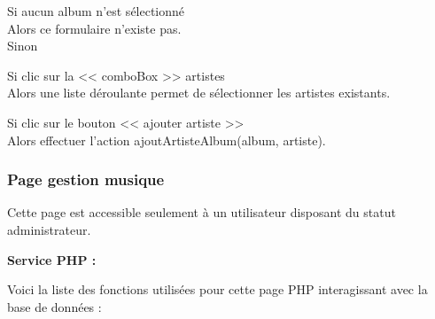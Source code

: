 			\begin{paragraphe}
				Si aucun album n'est sélectionné \\
				Alors ce formulaire n'existe pas. \\
				Sinon
			\end{paragraphe}

			\begin{paragraphe}
				Si clic sur la << comboBox >> artistes \\
				Alors une liste déroulante permet de sélectionner les artistes existants.
			\end{paragraphe}

			\begin{paragraphe}
				Si clic sur le bouton << ajouter artiste >> \\
				Alors effectuer l'action ajoutArtisteAlbum(album, artiste).
			\end{paragraphe}

		\subsubsection{Page gestion musique}

			\begin{paragraphe}
				Cette page est accessible seulement à un utilisateur disposant du statut administrateur.
			\end{paragraphe}

			\begin{paragraphe}
				\textbf{Service PHP :}
			\end{paragraphe}

			\begin{paragraphe}
				Voici la liste des fonctions utilisées pour cette page PHP interagissant avec la base de données :
			\end{paragraphe}

